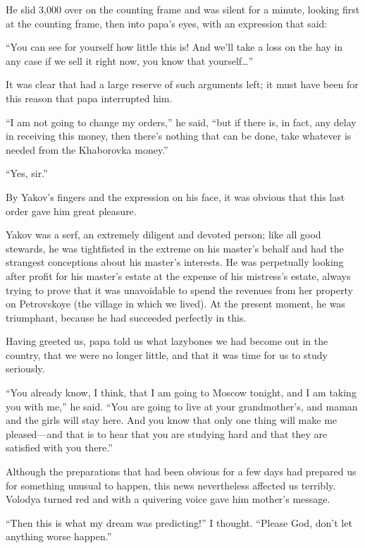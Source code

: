 He slid 3,000 over on the counting frame and was silent for a minute, looking first at the counting frame, then into papa's eyes, with an expression that said:

``You can see for yourself how little this is! And we'll take a loss on the hay in any case if we sell it right now, you know that yourself\ldots{}'' %

It was clear that had a large reserve of such arguments left; it must have been for this reason that papa interrupted him.

``I am not going to change my orders,'' he said, ``but if there is, in fact, any delay in receiving this money, then there's nothing that can be done, take whatever is needed from the Khaborovka money.'' %

``Yes, sir.'' %

By Yakov's fingers and the expression on his face, it was obvious that this last order gave him great pleasure.

Yakov was a serf, an extremely diligent and devoted person; like all good stewards, he was tightfisted in the extreme on his master's behalf and had the strangest conceptions about his master's interests. He was perpetually looking after profit for his master's estate at the expense of his mistress's estate, always trying to prove that it was unavoidable to spend the revenues from her property on Petrovskoye (the village in which we lived). At the present moment, he was triumphant, because he had succeeded perfectly in this.

Having greeted us, papa told us what lazybones we had become out in the country, that we were no longer little, and that it was time for us to study seriously.

``You already know, I think, that I am going to Moscow tonight, and I am taking you with me,'' he said. ``You are going to live at your grandmother's, and maman and the girls will stay here. And you know that only one thing will make me pleased---and that is to hear that you are studying hard and that they are satisfied with you there.'' %

Although the preparations that had been obvious for a few days had prepared us for something unusual to happen, this news nevertheless affected us terribly. Volodya turned red and with a quivering voice gave him mother's message.

``Then this is what my dream was predicting!'' I thought. ``Please God, don't let anything worse happen.'' %

